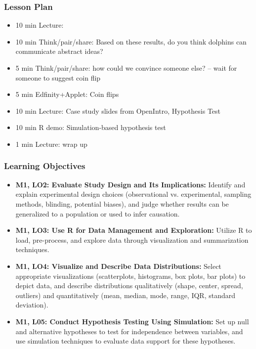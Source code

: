 \begin{frame}
    \frametitle{Lesson Plan}
    \begin{itemize}
        \item 10 min Lecture: 
        \item 10 min Think/pair/share: Based on these results, do you think dolphins can communicate abstract ideas?
        \item 5 min Think/pair/share: how could we convince someone else? -- wait for someone to suggest coin flip
        \item 5 min Edfinity+Applet: Coin flips
        \item 10 min Lecture: Case study slides from OpenIntro, Hypothesis Test
        \item 10 min R demo: Simulation-based hypothesis test
        \item 1 min Lecture: wrap up
    \end{itemize}
\end{frame}

\begin{frame}
    \frametitle{Learning Objectives}
    \begin{itemize}
        \item \textbf{M1, LO2: Evaluate Study Design and Its Implications:} Identify and explain experimental design choices (observational vs. experimental, sampling methods, blinding, potential biases), and judge whether results can be generalized to a population or used to infer causation. 
        \item \textbf{M1, LO3: Use R for Data Management and Exploration:} Utilize R to load, pre-process, and explore data through visualization and summarization techniques.
        \item \textbf{M1, LO4: Visualize and Describe Data Distributions:} Select appropriate visualizations (scatterplots, histograms, box plots, bar plots) to depict data, and describe distributions qualitatively (shape, center, spread, outliers) and quantitatively (mean, median, mode, range, IQR, standard deviation).
        \item \textbf{M1, L05: Conduct Hypothesis Testing Using Simulation:} Set up null and alternative hypotheses to test for independence between variables, and use simulation techniques to evaluate data support for these hypotheses.
    \end{itemize}
\end{frame}

